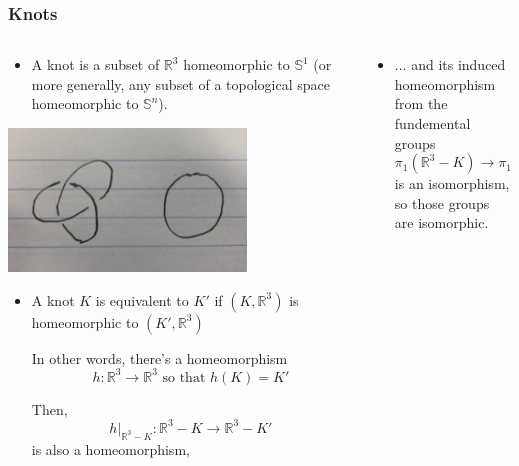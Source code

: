 \documentclass[8pt]{beamer}
\begin{document}
  \begin{frame}
    \frametitle{Knots}
    \begin{columns}
      \begin{column}[T]{0.5\textwidth}
        \begin{itemize}
          \item
            A knot is a subset of $\mathbb{R}^3$ homeomorphic to $\mathbb{S}^1$
            (or more generally, any subset of a topological space homeomorphic
            to $\mathbb{S}^n$).
        \end{itemize}

        \begin{center}
        \includegraphics[width=0.7\textwidth]{img/knots.JPG}
        \end{center}

        \begin{itemize}
          \item
            A knot $K$ is equivalent to $K'$ if
            $(K, \mathbb{R}^3)$ is homeomorphic to $(K', \mathbb{R}^3)$

            In other words, there's a homeomorphism
            \[h : \mathbb{R}^3 \rightarrow \mathbb{R}^3 \text{ so that }
            h(K) = K'\]

            Then,
            \[h|_{\mathbb{R}^3-K} : \mathbb{R}^3-K \rightarrow \mathbb{R}^3-K'\]
            is also a homeomorphism,
        \end{itemize}
      \end{column}


      \begin{column}[T]{0.5\textwidth}
        \begin{itemize}
          \item
            ... and its induced homeomorphism from the fundemental groups
            \[\pi_1(\mathbb{R}^3-K) \rightarrow \pi_1(\mathbb{R}^3-K')\]
            is an isomorphism, so those groups are isomorphic.


\end{itemize}
\end{column}
\end{columns}
\end{frame}
\end{document}
